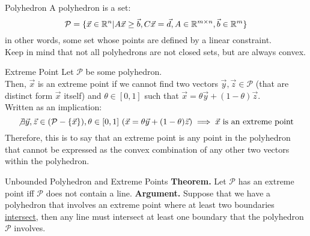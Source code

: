 \begin{ln-define}{Polyhedron}{}
    A polyhedron is a set:
    \[
        \mathcal{P} = 
        \{
            \vec{x} \in \mathbb{R}^n | A \vec{x} \geq \vec{b}, C \vec{x} = \vec{d}, A \in \mathbb{R}^{m \times n}, \vec{b} \in \mathbb{R}^m
        \}
    \]
    in other words, some set whose points are defined by a linear constraint. \\
    Keep in mind that not all polyhedrons are not closed sets, but are always convex.
\end{ln-define}
\begin{ln-define}{Extreme Point}{}
    Let $\mathcal{P}$ be some polyhedron. \\
    Then, $\vec{x}$ is an extreme point if we cannot find two vectors $\vec{y}, \vec{z} \in \mathcal{P}$ (that are distinct form $\vec{x}$ itself) and $\theta \in [0, 1]$ such that $\vec{x} = \theta \vec{y} + (1 - \theta) \vec{z}$. \\
    Written as an implication:
    \[
        \not\exists \vec{y}, \vec{z} \in (\mathcal{P} - \{\vec{x}\}), \theta \in [0, 1]\ (\vec{x} = \theta \vec{y} + (1 - \theta) \vec{z}) \implies \vec{x} \text{ is an extreme point}
    \]
    Therefore, this is to say that an extreme point is any point in the polyhedron that cannot be expressed as the convex combination of any other two vectors within the polyhedron.
\end{ln-define}
\begin{ln-theorem}{Unbounded Polyhedron and Extreme Points}{}
    \textbf{Theorem.}
    Let $\mathcal{P}$ has an extreme point iff $\mathcal{P}$ does not contain a line.
    \tcblower
    \textbf{Argument.}
    Suppose that we have a polyhedron that involves an extreme point where at least two boundaries \underline{intersect}, then any line must intersect at least one boundary that the polyhedron $\mathcal{P}$ involves.
\end{ln-theorem}
